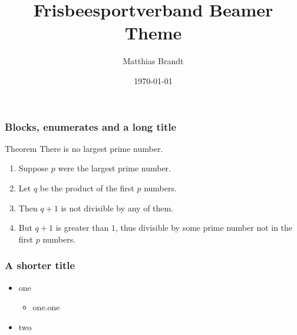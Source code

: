 \documentclass[ngerman, aspectratio=169]{beamer}
\title{Frisbeesportverband Beamer Theme}
\date{\today}
\author[M. Brandt]{Matthias Brandt}
\institute{Deutscher\par Frisbeesport-Verband e.V.}
\begin{document}
\begin{frame}
  \titlepage
\end{frame}

\begin{frame} 
  \frametitle{Blocks, enumerates and a long title} 
  \begin{block}{\centering Theorem}
    There is no largest prime number.
  \end{block} 

  \begin{enumerate} 
  \item<1-| alert@1> Suppose $p$ were the largest prime number. 
  \item<2-> Let $q$ be the product of the first $p$ numbers. 
  \item<3-> Then $q+1$ is not divisible by any of them. 
  \item<4-> But $q + 1$ is greater than $1$, thus divisible by some prime
    number not in the first $p$ numbers.
  \end{enumerate}
\end{frame}

\begin{frame}
  \frametitle{A shorter title}
  \begin{itemize}
  \item one
    \begin{itemize}
    \item one.one
    \end{itemize}
  \item two
  \end{itemize}
\end{frame}
\end{document}
